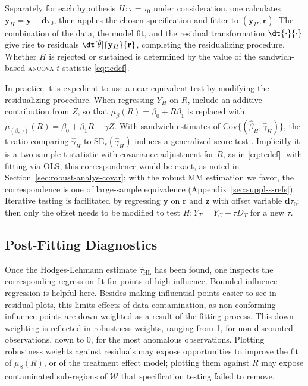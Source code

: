 Separately for each hypothesis $H: \tau=\tau_0$ under
consideration, one calculates
$\mathbf{y}_{H} = \mathbf{y} - \mathbf{d}\tau_{0}$, then
applies the chosen specification and fitter to
$(\mathbf{y}_{H}, \mathbf{r})$.
The combination of the data, the
model fit, and the residual transformation $\dt{\cdot}{\cdot}$ give rise to residuals
$\dt[\hat\theta]{\mathbf{y}_{H}}{\mathbf{r}}$, completing the
residualizing procedure. Whether $H$ is rejected or sustained is
determined by the value of the sandwich-based \textsc{ancova} $t$-statistic
\eqref{eq:tedef}.

In practice it is expedient to use a near-equivalent
test by modifying the residualizing
procedure.
When regressing $Y_{H}$ on $R$, include an additive
contribution from $Z$, so that $\mu_{\beta}(R) =\beta_{0} +
R\beta_{1}$ is replaced with $\mu_{(\beta,\gamma)}(R) =\beta_{0} +
\beta_{1}R + \gamma Z$. With sandwich estimates of
$\text{Cov}\{(\hat{\beta}_{H}, \hat{\gamma}_{H})\}$,
the t-ratio comparing $\hat{\gamma}_{H}$ to
$\text{SE}_{s}(\hat{\gamma}_{H})$ induces a generalized score test \citep{boos1992genscoretest}. Implicitly it is a two-sample
t-statistic with covariance adjustment for $R$, as in \eqref{eq:tedef}: with fitting via OLS,
this correspondence would be exact, as noted in Section~\ref{sec:robust-analys-covar}; with the robust MM estimation we
favor, the correspondence is one of large-sample equivalence
(Appendix~\ref{sec:suppl-s-refs}).
Iterative testing is facilitated by regressing $\mathbf{y}$ on $\mathbf{r}$ and $\mathbf{z}$
with offset variable $\mathbf{d}\tau_{0}$; then only the offset needs to
be modified to test $H: Y_{T} = Y_{C} +  \tau D_{T}$ for a new $\tau$.

\subsection{Post-Fitting Diagnostics} \label{sec:post-fitt-diagn}
Once the Hodges-Lehmann estimate $\hat{\tau}_{\mathrm{HL}}$ has been found, one
inspects the corresponding regression fit for points of high influence.
Bounded influence regression is helpful here.  Besides making
influential points easier to see in residual plots, this limits
effects of data contamination, as non-conforming influence points are
down-weighted as a result of the fitting process. This down-weighting
is reflected in robustness weights, ranging from 1, for non-discounted
observations, down to 0, for the most anomalous observations.
Plotting %
robustness weights against residuals may expose opportunities to
improve the fit of $\mu_{\beta}(R)$, or of the treatment effect model;
plotting them against $R$ may expose contaminated sub-regions
of $\mathcal{W}$ that specification testing failed to remove.



